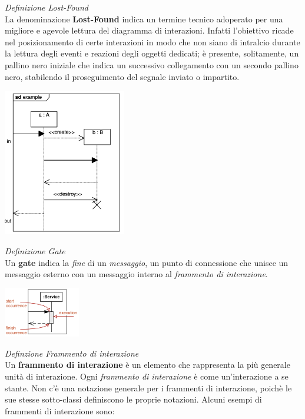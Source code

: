 \documentclass{article}
\begin{document}
\textit{Definizione Lost-Found}\\
La denominazione \textbf{Lost-Found} indica un termine tecnico adoperato per una migliore e agevole lettura del diagramma di interazioni. Infatti l'obiettivo ricade nel posizionamento di certe interazioni in modo che non siano di intralcio durante la lettura degli eventi e reazioni degli oggetti dedicati; è presente, solitamente, un pallino nero iniziale che indica un successivo collegamento con un secondo pallino nero, stabilendo il proseguimento del segnale inviato o impartito.\vspace*{14pt}
\begin{center}
    \includegraphics[width=0.4\textwidth]{foto 10.png}\\
\end{center}
\textit{Definizione Gate}\\
Un \textbf{gate} indica la \textit{fine} di un \textit{messaggio}, un punto di connessione che unisce un messaggio esterno con un messaggio interno al\textit{ frammento di interazione}.\vspace*{14pt}
\begin{center}
    \includegraphics[width=0.25\textwidth]{foto 11.png}\\
\end{center}
\textit{Definzione Frammento di interazione}\\
Un \textbf{frammento di interazione} è un elemento che rappresenta la più generale unità di interazione. Ogni \textit{frammento di interazione} è come un'interazione a se stante. Non c'è una notazione generale per i frammenti di interazione, poichè le sue stesse sotto-classi definiscono le proprie notazioni. Alcuni esempi di frammenti di interazione sono:
\end{document}
